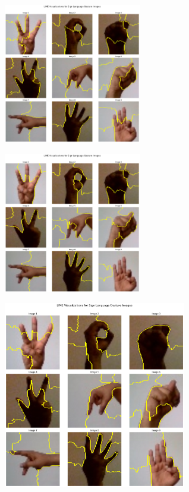 \begin{multicols}{2}
\includegraphics[width=0.45\textwidth]{Assets/lime_visualization/RESNET152.png}

\vspace{0.8cm}

\includegraphics[width=0.45\textwidth]{Assets/lime_visualization/vgg16.png}

\vspace{0.8cm}

\end{multicols}


\renewcommand{\thefigure}{2.\arabic{figure}} %

\begin{center}
    \includegraphics[width=0.6\textwidth]{Assets/lime_visualization/CONVNEXT.png}
\end{center}


